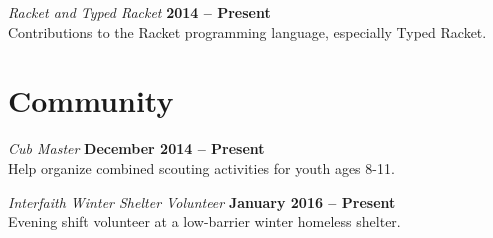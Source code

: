 \documentclass[margin,line]{res}
\begin{document}
\begin{resume}
{\em Racket and Typed Racket} \hfill {\bf 2014 --
  Present}\\ Contributions to the Racket programming language,
especially Typed Racket.

\section{\sc Community}

{\em Cub Master} \hfill {\bf December 2014 -- Present}\\
Help organize combined scouting activities for youth ages 8-11.

\vspace{-.3cm} {\em Interfaith Winter Shelter Volunteer} \hfill {\bf
  January 2016 -- Present }\\ Evening shift volunteer at a low-barrier
winter homeless shelter.


\end{resume}
\end{document}
